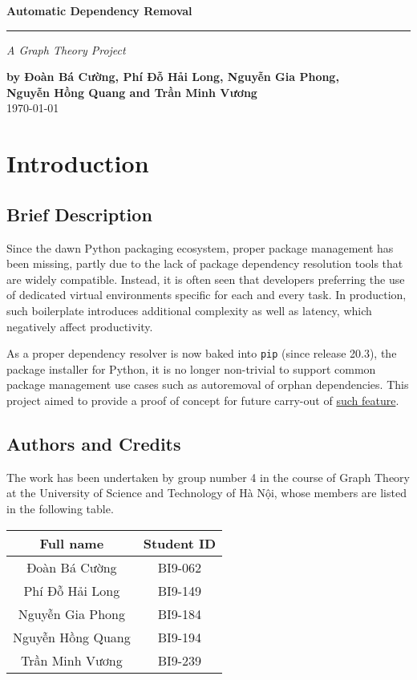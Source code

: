 \documentclass[a4paper,12pt]{article}
\newcommand{\usth}{{\selectlanguage{vietnamese}University
  of Science and Technology of Hà Nội}}
\begin{document}
\setcounter{page}{0}
\thispagestyle{empty}
\begin{flushright}
  \setlength{\baselineskip}{1.4\baselineskip}
  \textbf{\Large Automatic Dependency Removal}
  \noindent\rule{\textwidth}{3pt}
  \emph{\Large A Graph Theory Project}

  \textbf{by Đoàn Bá Cường, Phí Đỗ Hải Long, Nguyễn Gia Phong,\\
          Nguyễn Hồng Quang and Trần Minh Vương\\}
  \today
\end{flushright}
\pagebreak

\pagebreak

\section{Introduction}
\subsection{Brief Description}
Since the dawn Python packaging ecosystem, proper package management
has been missing, partly due to the lack of package dependency resolution tools
that are widely compatible.  Instead, it is often seen that
developers preferring the use of dedicated virtual environments
specific for each and every task.  In production, such boilerplate
introduces additional complexity as well as latency,
which negatively affect productivity.

As a proper dependency resolver is now baked into \verb|pip| (since release
20.3), the package installer for Python, it is no longer non-trivial to support
common package management use cases such as autoremoval of orphan dependencies.
This project aimed to provide a proof of concept for future carry-out
of \href{https://github.com/pypa/pip/issues/5823}{such feature}.

\subsection{Authors and Credits}
The work has been undertaken by group number 4 in the course of Graph Theory
at the \usth, whose members are listed in the following table.

\begin{center}
  \begin{tabular}{c c}
    \toprule
    Full name & Student ID\\
    \midrule
    Đoàn Bá Cường & BI9-062\\
    Phí Đỗ Hải Long & BI9-149\\
    Nguyễn Gia Phong & BI9-184\\
    Nguyễn Hồng Quang & BI9-194\\
    Trần Minh Vương & BI9-239\\
    \bottomrule
  \end{tabular}
\end{center}
\end{document}
